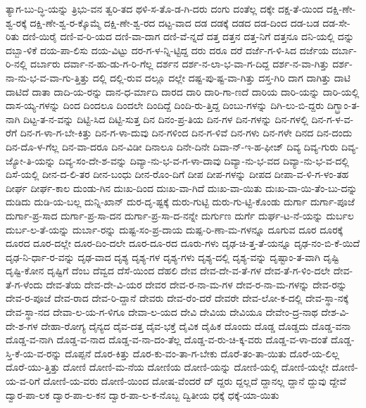 {ತ್ಯಾಗ-ಬು-ದ್ಧಿ-ಯನ್ನು
ತ್ರಿಭು-ವನ
ತ್ವರಿ-ತದ
ಥಳಿ-ಸ-ತೊ-ಡ-ಗಿ-ದರು
ದಂಗು
ದಂತೆಲ್ಲ
ದಕ್ಕೇ
ದಕ್ಷ-ತೆ-ಯಿಂದ
ದಕ್ಷಿ-ಣೇ-ಶ್ವ-ರಕ್ಕೆ
ದಕ್ಷಿ-ಣೇ-ಶ್ವ-ರ-ಕ್ಕೊಮ್ಮೆ
ದಕ್ಷಿ-ಣೇ-ಶ್ವ-ರದ
ದಟ್ಟ-ವಾದ
ದಡ
ದಡಕ್ಕೆ
ದಡದ
ದಡ-ದಿಂದ
ದಡ-ಬಡ
ದಡ-ಸೇ-ರಿತು
ದಣಿ-ಯಿರೈ
ದಣಿ-ವ-ರಿ-ಯದ
ದಣಿ-ವಾ-ದಾಗ
ದಣಿ-ವೆ-ನ್ನದೆ
ದತ್ತ
ದತ್ತನ
ದತ್ತ-ನಿಗೆ
ದತ್ತನೂ
ದನಿ-ಯಲ್ಲಿ
ದನ್ನು
ದಬ್ಬಾ-ಳಿಕೆ
ದಯ-ಪಾ-ಲಿಸು
ದಯ-ವಿಟ್ಟು
ದರ-ಗ-ಳ-ನ್ನಿ-ಟ್ಟಿದ್ದ
ದರು
ದರೂ
ದರೆ
ದರ್ಜೆ-ಗ-ಳಿ-ಸಿದ
ದರ್ಜೆಯ
ದರ್ಬಾ-ರಿ-ನಲ್ಲಿ
ದರ್ಬಾರು
ದರ್ವಾ-ನ-ಹು-ಡು-ಗ-ರಿ-ಗೆಲ್ಲ
ದರ್ಶನ
ದರ್ಶ-ನ-ಲಾ-ಭ-ವಾ-ಗ-ದಿದ್ದ
ದರ್ಶ-ನ-ವಾ-ಗಿತ್ತು
ದರ್ಶ-ನಾ-ನು-ಭ-ವ-ವಾ-ಗು-ತ್ತಿತ್ತು
ದಲ್ಲಿ
ದಲ್ಲಿ-ರುವ
ದಲ್ಲೂ
ದಲ್ಲೇ
ದಷ್ಟ-ಪು-ಷ್ಟ-ವಾ-ಗಿತ್ತು
ದಸ್ತ-ಗಿರಿ
ದಾಗ
ದಾಗಿತ್ತು
ದಾಟಿ
ದಾಟಿದೆ
ದಾತಾ
ದಾದಿ-ಯ-ರನ್ನು
ದಾನ-ಧ-ರ್ಮಾದಿ
ದಾರದ
ದಾರಿ
ದಾರಿ-ಗಾ-ಣದೆ
ದಾರಿಯ
ದಾರಿ-ಯನ್ನು
ದಾರಿ-ಯಲ್ಲಿ
ದಾಸ-ಯ್ಯ-ಗಳನ್ನು
ದಿಂದ
ದಿಂದಲೂ
ದಿಂದಲೇ
ದಿಂದಿದ್ದೆ
ದಿಂದಿ-ರು-ತ್ತಿದ್ದ
ದಿಂಬು-ಗಳನ್ನು
ದಿಗಿ-ಲು-ಬಿ-ದ್ದರು
ದಿಗ್ಭ್ರಾಂ-ತ-ನಾಗಿ
ದಿಟ್ಟ-ತ-ನ-ವನ್ನು
ದಿಟ್ಟಿ-ಸಿದ
ದಿಟ್ಟಿ-ಸುತ್ತ
ದಿನ
ದಿನಂ-ಪ್ರ-ತಿಯ
ದಿನ-ಗಳ
ದಿನ-ಗಳನ್ನು
ದಿನ-ಗಳಲ್ಲಿ
ದಿನ-ಗ-ಳ-ವ-ರೆಗೆ
ದಿನ-ಗ-ಳಾ-ಗ-ಬೇ-ಕಿತ್ತು
ದಿನ-ಗ-ಳಾ-ದುವು
ದಿನ-ಗಳಿಂದ
ದಿನ-ಗ-ಳಿವೆ
ದಿನ-ಗಳು
ದಿನ-ಗಳೇ
ದಿನದ
ದಿನ-ದಂದು
ದಿನ-ದೊ-ಳ-ಗೆಲ್ಲ
ದಿನ-ವಾ-ದರೂ
ದಿನ-ವಿಡೀ
ದಿನಾಲೂ
ದಿನೇ-ದಿನೇ
ದಿವಾ-ನ್-ಇ-ಹ-ಫೀಜ್
ದಿವ್ಯ
ದಿವ್ಯ-ಗುರು
ದಿವ್ಯ-ಜ್ಯೋ-ತಿ-ಯನ್ನು
ದಿವ್ಯ-ಸಂ-ದೇ-ಶ-ವನ್ನು
ದಿವ್ಯಾ-ನು-ಭ-ವ-ಗ-ಳಾ-ದಾವು
ದಿವ್ಯಾ-ನು-ಭ-ವದ
ದಿವ್ಯಾ-ನು-ಭ-ವ-ದಲ್ಲಿ
ದಿಸೆ-ಯಲ್ಲಿ
ದೀನ-ದ-ಲಿ-ತರ
ದೀನ-ಬಂಧು
ದೀನ-ರೊಂ-ದಿಗೆ
ದೀಪ
ದೀಪ-ಗಳನ್ನು
ದೀಪದ
ದೀಪಾ-ವ-ಳಿ-ಗ-ಳಂ-ತಹ
ದೀರ್ಘ
ದೀರ್ಘ-ಕಾಲ
ದುಂಡು-ಗಿನ
ದುಃಖ-ದಿಂದ
ದುಃಖ-ವಾ-ಗಿದೆ
ದುಃಖ-ವಾ-ಯಿತು
ದುಃಖ-ವಾ-ಯಿ-ತೆಂ-ಬು-ದನ್ನು
ದುಡಿದು
ದುಡಿ-ಯ-ಬಲ್ಲ
ದುನ್ನಿ-ಖಾನ್
ದುರ-ದೃ-ಷ್ಟಕ್ಕೆ
ದುರು-ಗುಟ್ಟಿ
ದುರು-ಗು-ಟ್ಟಿ-ಕೊಂಡು
ದುರ್ಗಾ
ದುರ್ಗಾ-ಪೂಜೆ
ದುರ್ಗಾ-ಪ್ರ-ಸಾದ
ದುರ್ಗಾ-ಪ್ರ-ಸಾ-ದನ
ದುರ್ಗಾ-ಪ್ರ-ಸಾ-ದ-ನನ್ನೇ
ದುರ್ಗುಣ
ದುರ್ಗೆ
ದುರ್ಘ-ಟ-ನೆ-ಯನ್ನು
ದುರ್ಬಲ
ದುರ್ಬ-ಲ-ತೆ-ಯನ್ನು
ದುರ್ಬಾ-ರನ್ನು
ದುಷ್ಟ-ಸಂ-ಪ್ರ-ದಾಯ
ದುಷ್ಪ-ರಿ-ಣಾ-ಮ-ಗಳನ್ನೂ
ದೂಗುವ
ದೂರ
ದೂರಕ್ಕೆ
ದೂರದ
ದೂರ-ದಲ್ಲೇ
ದೂರ-ದಿಂ-ದಲೇ
ದೂರ-ದೂ-ರದ
ದೂರು-ಗಳು
ದೃಢ-ಚಿ-ತ್ತ-ತೆ-ಯನ್ನೂ
ದೃಢ-ನಂ-ಬಿ-ಕೆ-ಯಿದೆ
ದೃಢ-ನಿ-ರ್ಧಾ-ರ-ವನ್ನು
ದೃಢ-ವಾದ
ದೃಶ್ಯ
ದೃಶ್ಯ-ಗಳ
ದೃಶ್ಯ-ಗಳು
ದೃಶ್ಯ-ದಲ್ಲಿ
ದೃಶ್ಯ-ವನ್ನು
ದೃಷ್ಟಾಂ-ತ-ವಾಗಿ
ದೃಷ್ಟಿ
ದೃಷ್ಟಿ-ಕೋನ
ದೃಷ್ಟಿಗೆ
ದೆಂಬ
ದೆವ್ವದ
ದೆಸೆ-ಯಿಂದ
ದೆಹಲಿ
ದೇವ
ದೇವ-ದೇ-ವ-ತೆ-ಗಳ
ದೇವ-ತೆ-ಗ-ಳಿಂ-ದಲೇ
ದೇವ-ತೆ-ಗ-ಳೆಂದು
ದೇವ-ತೆಯ
ದೇವ-ದೇ-ವಿ-ಯರ
ದೇವರ
ದೇವ-ರ-ನಾ-ಮ-ಗಳ
ದೇವ-ರ-ನಾ-ಮ-ಗಳನ್ನು
ದೇವ-ರನ್ನು
ದೇವ-ರ-ಪೂಜೆ
ದೇವ-ರಾದ
ದೇವ-ರಿ-ದ್ದಾನೆ
ದೇವರು
ದೇವ-ರೆಂ-ದರೆ
ದೇವರೇ
ದೇವ-ಲೋ-ಕ-ದಲ್ಲಿ
ದೇವ-ಸ್ಥಾ-ನಕ್ಕೆ
ದೇವ-ಸ್ಥಾ-ನದ
ದೇವಾ-ಲ-ಯ-ಗ-ಳಿಗೂ
ದೇವಾ-ಲ-ಯದ
ದೇವಿ
ದೇವಿಯ
ದೇವಿಯೂ
ದೇವೇಂ-ದ್ರ-ನಾಥ
ದೇಶ-ವಿ-ದೇ-ಶ-ಗಳ
ದೇಹಾ-ರೋಗ್ಯ
ದೈನ್ಯದ
ದೈವ-ದತ್ತ
ದೈವ-ಭಕ್ತೆ
ದೈವಿಕ
ದೈಹಿಕ
ದೊಂದು
ದೊಡ್ಡ
ದೊಡ್ಡದು
ದೊಡ್ಡ-ವನಾ
ದೊಡ್ಡ-ವ-ನಾಗಿ
ದೊಡ್ಡ-ವ-ನಾದ
ದೊಡ್ಡ-ವ-ನಾ-ದಂ-ತೆಲ್ಲ
ದೊಡ್ಡ-ವ-ರು-ಚಿ-ಕ್ಕ-ವರು
ದೊಡ್ಡ-ವ-ಳಾ-ದಂತೆ
ದೊಡ್ಡ-ಸ್ತಿ-ಕೆ-ಯ-ವ-ರನ್ನು
ದೊಪ್ಪನೆ
ದೊರ-ಕಿತ್ತು
ದೊರ-ಕು-ವಂ-ತಾ-ಗ-ಬೇಕು
ದೊರೆ-ತಂ-ತಾ-ಯಿತು
ದೊರೆ-ಯ-ಲಿಲ್ಲ
ದೊರೆ-ಯು-ತ್ತಿತ್ತು
ದೋಣಿ
ದೋಣಿ-ಮ-ನೆಯ
ದೋಣಿಯ
ದೋಣಿ-ಯನ್ನು
ದೋಣಿ-ಯಲ್ಲಿ
ದೋಣಿ-ಯಲ್ಲೇ
ದೋಣಿ-ಯ-ವ-ರಿಗೆ
ದೋಣಿ-ಯ-ವರು
ದೋಣಿ-ಯಿಂದ
ದೋಷ-ವೆಂದರೆ
ದ್
ದ್ದರು
ದ್ದಲ್ಲದೆ
ದ್ದಾನಲ್ಲ
ದ್ದಾನೆ
ದ್ದುವು
ದ್ದೇವೆ
ದ್ವಾರ-ಪಾ-ಲಕ
ದ್ವಾರ-ಪಾ-ಲ-ಕನ
ದ್ವಾರ-ಪಾ-ಲ-ಕ-ನೊಬ್ಬ
ದ್ವಿತೀಯ
ಧಕ್ಕೆ
ಧಕ್ಕೆ-ಯಾ-ಯಿತು
}
